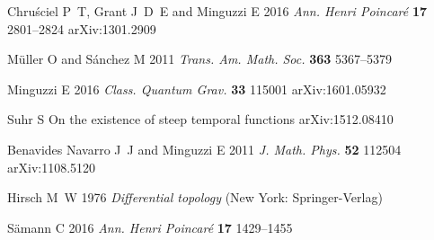 \documentclass[a4paper]{jpconf}
\theoremstyle{definition}
\theoremstyle{remark}
\begin{document}
\begin{thebibliography}{10}
Chru{\'s}ciel P~T, Grant J~D~E and Minguzzi E 2016 {\em Ann. Henri
  {P}oincar{\'e}\/} {\bf 17} 2801--2824 {arXiv}:1301.2909

M{\"u}ller O and S{\'a}nchez M 2011 {\em Trans. Am. Math. Soc.\/} {\bf 363}
  5367--5379

Minguzzi E 2016 {\em Class. Quantum Grav.\/} {\bf 33} 115001 {arXiv}:1601.05932

Suhr S On the existence of steep temporal functions {arXiv:}1512.08410

{Benavides Navarro} J~J and Minguzzi E 2011 {\em J. Math. Phys.\/} {\bf 52}
  112504 {arXiv}:1108.5120

Hirsch M~W 1976 {\em Differential topology\/} (New York: {Springer-Verlag})

S{\"a}mann C 2016 {\em Ann. Henri Poincar{\'e}\/} {\bf 17} 1429--1455

\end{thebibliography}
\end{document}
